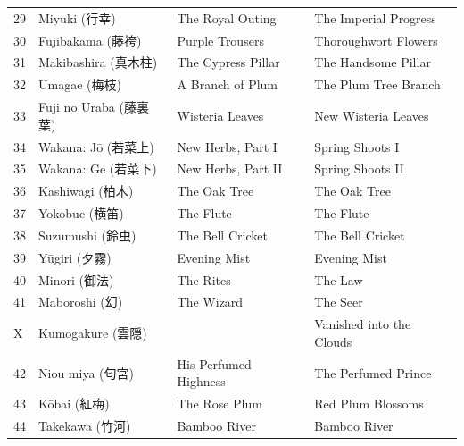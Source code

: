 \documentclass{article}
\begin{document}
\begin{table}
\begin{tabular}{llll}
		29          & Miyuki (行幸)            & The Royal Outing                    & The Imperial Progress         \\
		30          & Fujibakama (藤袴)        & Purple Trousers                     & Thoroughwort Flowers          \\
		31          & Makibashira (真木柱)      & The Cypress Pillar                  & The Handsome Pillar           \\
		32          & Umagae (梅枝)            & A Branch of Plum                    & The Plum Tree Branch          \\
		33          & Fuji no Uraba (藤裏葉)    & Wisteria Leaves                     & New Wisteria Leaves           \\
		34          & Wakana: Jō (若菜上)       & New Herbs, Part I                   & Spring Shoots I               \\
		35          & Wakana: Ge (若菜下)       & New Herbs, Part II                  & Spring Shoots II              \\
		36          & Kashiwagi (柏木)         & The Oak Tree                        & The Oak Tree                  \\
		37          & Yokobue (横笛)           & The Flute                           & The Flute                     \\
		38          & Suzumushi (鈴虫)         & The Bell Cricket                    & The Bell Cricket              \\
		39          & Yūgiri (夕霧)            & Evening Mist                        & Evening Mist                  \\
		40          & Minori (御法)            & The Rites                           & The Law                       \\
		41          & Maboroshi (幻)          & The Wizard                          & The Seer                      \\
		X           & Kumogakure (雲隠)        &                                     & Vanished into the Clouds      \\
		42          & Niou miya (匂宮)         & His Perfumed Highness               & The Perfumed Prince           \\
		43          & Kōbai (紅梅)             & The Rose Plum                       & Red Plum Blossoms             \\
		44          & Takekawa (竹河)          & Bamboo River                        & Bamboo River                  \\

\end{tabular}
\end{table}
\end{document}
